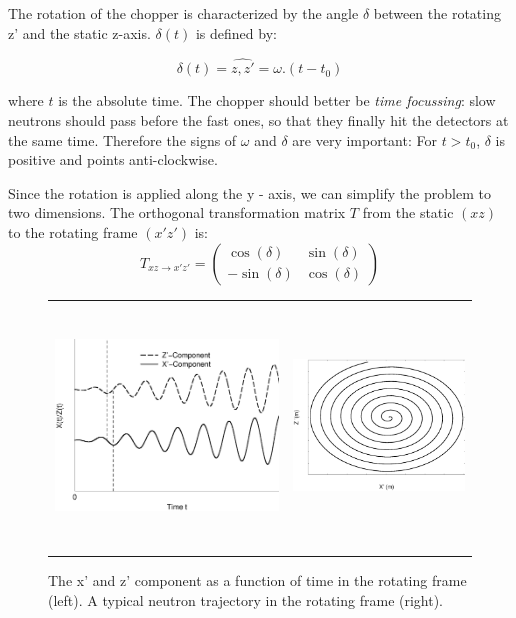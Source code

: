 The rotation of the chopper is characterized by the angle $\delta$ between the rotating z' and the static z-axis. $\delta(t)$ is defined by:

$$\delta(t) = \widehat{z,z'} = \omega.(t-t_0)$$

where $t$ is the absolute time. The chopper should better be \emph{time focussing}: slow neutrons should pass before the fast ones, so that they finally hit the detectors at the same time. Therefore the signs of $\omega$ and $\delta$ are very important: For $t>t_0$, $\delta$ is positive and points anti-clockwise.

Since the rotation is applied along the y - axis, we can simplify the problem to two dimensions. The orthogonal transformation matrix $T$ from the static $(xz)$ to the rotating frame $(x'z')$ is:
\begin{equation}
T_{xz \rightarrow x'z'} = \left(
\begin{array}{cc}
\cos(\delta) & \sin (\delta) \\
-\sin(\delta) & \cos(\delta)
\end{array}
\right)
\end{equation}

\begin{figure}
\begin{center}
\begin{tabular}{cc}
\includegraphics[height=5.5cm]{./figures/XZCoords.eps}
&
\includegraphics[height=6.5cm,width=5.5cm]{./figures/XZplain.eps}
\end{tabular}
\end{center}
\caption{The x' and z' component as a function of time in the rotating frame (left). A typical neutron trajectory in the rotating frame (right).}
\label{fig:Component.eps}
\end{figure}

